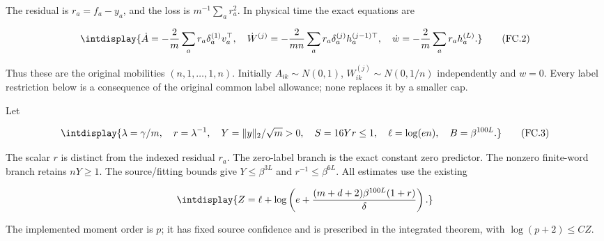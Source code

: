 
The residual is \(r_a=f_a-y_a\), and the loss is \(m^{-1}\sum_a r_a^2\). In physical time the exact equations are


\begingroup\renewcommand{\theHequation}{intdisplay.692}
\begin{equation}
\intdisplay{
\dot A=-\frac2m\sum_a r_a\delta_a^{(1)}v_a^\top,\quad
\dot W^{(j)}=-\frac2{mn}\sum_a r_a\delta_a^{(j)}h_a^{(j-1)\top},
\quad \dot w=-\frac2m\sum_a r_a h_a^{(L)}.
}
\tag{FC.2}
\label{int:eq-0307-fc-2}
\end{equation}
\endgroup


Thus these are the original mobilities \((n,\allowbreak 1,\allowbreak \ldots,\allowbreak 1,\allowbreak n)\). Initially \(A_{ik}\sim N(0,\allowbreak 1)\), \(W^{(j)}_{ik}\sim N(0,\allowbreak 1/n)\) independently and \(w=0\). Every label restriction below is a consequence of the original common label allowance; none replaces it by a smaller cap.



Let


\begingroup\renewcommand{\theHequation}{intdisplay.693}
\begin{equation}
\intdisplay{
\lambda=\gamma/m,\quad r=\lambda^{-1},\quad
Y=\|y\|_2/\sqrt m>0,\quad S=16Yr\le1,\quad
\ell=\log(en),\quad B=\beta^{100L}.
}
\tag{FC.3}
\label{int:eq-0308-fc-3}
\end{equation}
\endgroup


The scalar \(r\) is distinct from the indexed residual \(r_a\). The zero-label branch is the exact constant zero predictor. The nonzero finite-word branch retains \(nY\ge1\). The source/fitting bounds give \(Y\le\beta^{3L}\) and \(r^{-1}\le\beta^{6L}\). All estimates use the existing


\begingroup\renewcommand{\theHequation}{intdisplay.694}
\begin{equation*}
\intdisplay{
Z=\ell+\log\left(e+
\frac{(m+d+2)\beta^{100L}(1+r)}\delta\right).
}
\end{equation*}
\endgroup


The implemented moment order is \(p\); it has fixed source confidence and is prescribed in the integrated theorem, with \(\log(p+2)\le CZ\).



